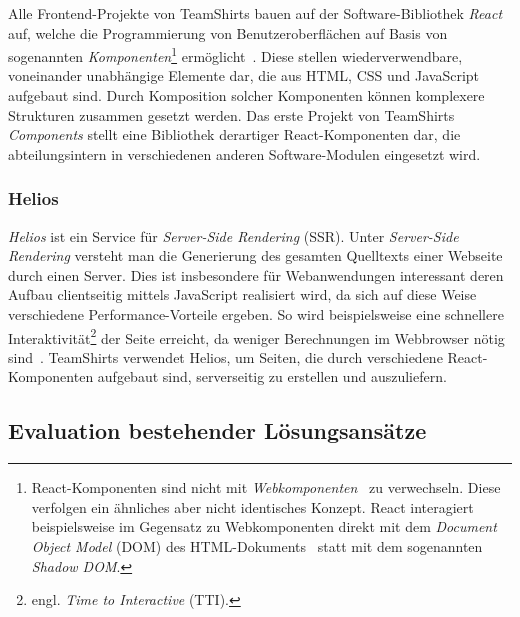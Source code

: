 Alle Frontend-Projekte von TeamShirts bauen auf der Software-Bibliothek \textit{React}~\autocite{SOFTWARE:REACT} auf, welche die Programmierung von Benutzeroberflächen auf Basis von sogenannten \emph{Komponenten}\footnote{React-Komponenten sind nicht mit \textit{Webkomponenten}~\autocite{MDN:WEBCOMPONENTS} zu verwechseln. Diese verfolgen ein ähnliches aber nicht identisches Konzept. React interagiert beispielsweise im Gegensatz zu Webkomponenten direkt mit dem \textit{Document Object Model} (DOM) des HTML-Dokuments~\autocite{REACT:WEBCOMPONENTS} statt mit dem sogenannten \textit{Shadow DOM}.} ermöglicht~\autocite{ACM:REACT}. Diese stellen wiederverwendbare, voneinander unabhängige Elemente dar, die aus HTML, CSS und JavaScript aufgebaut sind. Durch Komposition solcher Komponenten können komplexere Strukturen zusammen gesetzt werden. Das erste Projekt von TeamShirts \textit{Components} stellt eine Bibliothek derartiger React-Komponenten dar, die abteilungsintern in verschiedenen anderen Software-Modulen eingesetzt wird.

\subsubsection{Helios}

\textit{Helios} ist ein Service für \emph{Server-Side Rendering} (SSR). Unter \emph{Server-Side Rendering} versteht man die Generierung des gesamten Quelltexts einer Webseite durch einen Server. Dies ist insbesondere für Webanwendungen interessant deren Aufbau clientseitig mittels JavaScript realisiert wird, da sich auf diese Weise verschiedene Performance-Vorteile ergeben. So wird beispielsweise eine schnellere Interaktivität\footnote{engl. \emph{Time to Interactive} (TTI).} der Seite erreicht, da weniger Berechnungen im Webbrowser nötig sind~\autocite{GOOGLE:RENDERING_ON_THE_WEB}. TeamShirts verwendet Helios, um Seiten, die durch verschiedene React-Komponenten aufgebaut sind, serverseitig zu erstellen und auszuliefern.

\subsection{Evaluation bestehender Lösungsansätze}

